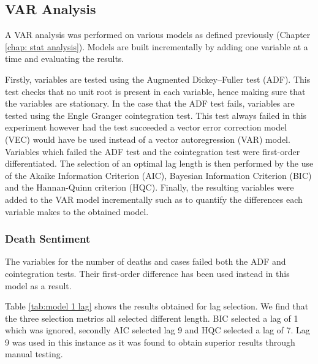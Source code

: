 \subsection{VAR Analysis}

A VAR analysis was performed on various models as defined previously (Chapter \ref{chap: stat analysis}). Models are built incrementally by adding one variable at a time and evaluating the results.

Firstly, variables are tested using the Augmented Dickey–Fuller test (ADF). This test checks that no unit root is present in each variable, hence making sure that the variables are stationary. In the case that the ADF test fails, variables are tested using the Engle Granger cointegration test. This test always failed in this experiment however had the test succeeded a vector error correction model (VEC) would have be used instead of a vector autoregression (VAR) model. Variables which failed the ADF test and the cointegration test were first-order differentiated. The selection of an optimal lag length is then performed by the use of the Akaike Information Criterion (AIC), Bayesian Information Criterion (BIC) and the Hannan-Quinn criterion (HQC). Finally, the resulting variables were added to the VAR model incrementally such as to quantify the differences each variable makes to the obtained model.

\subsubsection{Death Sentiment}

The variables for the number of deaths and cases failed both the ADF and cointegration tests. Their first-order difference has been used instead in this model as a result.

Table \ref{tab:model 1 lag} shows the results obtained for lag selection. We find that the three selection metrics all selected different length. BIC selected a lag of 1 which was ignored, secondly AIC selected lag 9 and HQC selected a lag of 7. Lag 9 was used in this instance as it was found to obtain superior results through manual testing.

